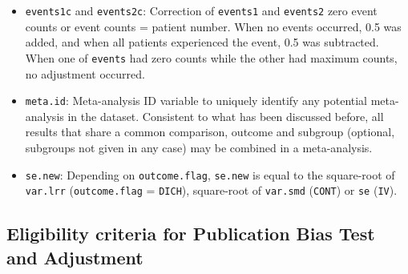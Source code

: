 \documentclass[11pt,a4paper,twoside]{book}\usepackage[]{graphicx}\usepackage[]{color}
\begin{document}
\begin{itemize}
\item \texttt{events1c} and \texttt{events2c}: Correction of \texttt{events1} and \texttt{events2} zero event counts or event counts = patient number. When no events occurred, 0.5 was added, and when all patients experienced the event, 0.5 was subtracted. When one of \texttt{events} had zero counts while the other had maximum counts, no adjustment occurred.
\item \texttt{meta.id}: Meta-analysis ID variable to uniquely identify any potential meta-analysis in the dataset. Consistent to what has been discussed before, all results that share a common comparison, outcome and subgroup (optional, subgroups not given in any case) may be combined in a meta-analysis.
\item \texttt{se.new}: Depending on \texttt{outcome.flag}, \texttt{se.new} is equal to the square-root of \texttt{var.lrr} (\texttt{outcome.flag} = \texttt{DICH}), square-root of \texttt{var.smd} (\texttt{CONT})
or \texttt{se} (\texttt{IV}).
\end{itemize}


\subsection{Eligibility criteria for Publication Bias Test and Adjustment} 
\end{document}
